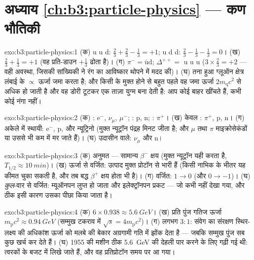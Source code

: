 \section*{अध्याय \ref{ch:b3:particle-physics} --- कण भौतिकी}

\begin{solution}{exo:b3:particle-physics:1}
(क) u u d: $\tfrac23 + \tfrac23 - \tfrac13 = +1$; u d d: $\tfrac23 -
\tfrac13 - \tfrac13 = 0$। (ख) $\tfrac23 + \tfrac13 = +1$ (वह
प्रति-डाउन $+\tfrac13$ ढोता है)। (ग) $\pi^- =
\bar{\text{u}}\text{d}$; $\Delta^{++} = $ u u u ($3\times\tfrac23 =
+2$ --- वही अवस्था, जिसकी सांख्यिकी ने रंग का आविष्कार थोपने में मदद
की)। (घ) तना हुआ ग्लूऑन क्षेत्र लंबाई के
$\propto$ ऊर्जा जमा करता है; और किसी  के मुक्त होने से बहुत
पहले वह जमा ऊर्जा $2m_{\text{q}}c^2$ से अधिक हो जाती है और वह डोरी
टूटकर एक ताज़ा युग्म बना देती है: आप कोई  बाहर खींचते हैं,
कभी कोई नंगा  नहीं।
\end{solution}

\begin{solution}{exo:b3:particle-physics:2}
(क) : e$^-$, $\nu_\mu$, $\mu^-$; : p, n; :
$\pi^+$। (ख) केवल : $\pi^+$, p, n। (ग) अकेले में स्थायी:
e$^-$, p, और न्यूट्रिनो (मुक्त न्यूट्रॉन पंद्रह
मिनट जीता है; और $\mu$ तथा $\pi$ माइक्रोसेकंडों या उससे भी कम में मर
जाते हैं)। (घ) उदासीन वाले: $\nu_\mu$ और n।
\end{solution}

\begin{solution}{exo:b3:particle-physics:3}
(क) अनुमत --- सामान्य $\beta^-$ क्षय (मुक्त न्यूट्रॉन यही करता है,
$T_{1/2} \approx \qty{10}{min}$)। (ख) ऊर्जा से वर्जित:
उत्पाद मुक्त प्रोटॉन से भारी हैं (किसी नाभिक के भीतर  यह कीमत चुका सकती है, और तब बद्ध $\beta^+$ क्षय होता भी है)। (ग)
वर्जित:  $1 \to 0$ (और 
$0 \to -1$)। (घ) \emph{कुल}-वार  से वर्जित:
म्यूऑनपन लुप्त हो जाता और इलेक्ट्रॉनपन प्रकट --- जो कभी नहीं
देखा गया, और ठीक इसी कारण उसका पीछा किया जाता है।
\end{solution}

\begin{solution}{exo:b3:particle-physics:4}
(क) $6\times0.938 \approx \qty{5.6}{GeV}$। (ख) प्रति पुंज गतिज ऊर्जा
$m_{\text{p}}c^2 \approx \qty{0.94}{GeV}$
(सम्मुख टकराव में $\sqrt s = 4m_{\text{p}}c^2$)। (ग) लगभग $3:1$:
संवेग का संरक्षण स्थिर-लक्ष्य की अधिकांश ऊर्जा को मलबे की बेकार
अग्रगामी गति में झोंक देता है --- जबकि सम्मुख पुंज
सब कुछ खर्च कर देते हैं। (घ) 1955 की मशीन ठीक
\qty{5.6}{GeV} की देहली पार करने के लिए गढ़ी गई थी: त्वरकों के बजट
 में लिखे जाते हैं, और वह प्रतिप्रोटॉन समय पर आ गया।
\end{solution}

